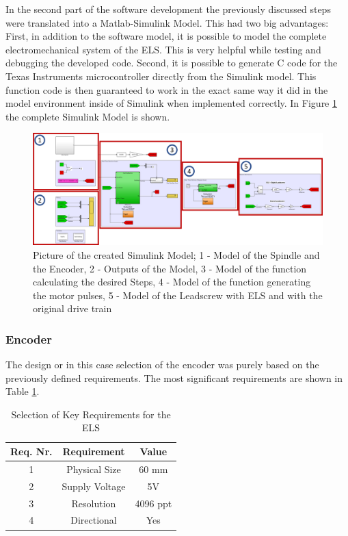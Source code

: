 In the second part of the software development the previously discussed steps were translated into a Matlab-Simulink Model. This had two big advantages: First, in addition to the software model, it is possible to model the complete electromechanical system of the ELS. This is very helpful while testing and debugging the developed code. Second, it is possible to generate C code for the Texas Instruments microcontroller directly from the Simulink model. This function code is then guaranteed to work in the exact same way it did in the model environment inside of Simulink when implemented correctly. In Figure \ref{Simulink Model} the complete Simulink Model is shown.
 
\begin{figure}
    \begin{center}
    \includegraphics[width=12cm]{Pictures/SimulinkModell.png}
    \caption[Picture of the created Simulink Model]{Picture of the created Simulink Model; 1 - Model of the Spindle and the Encoder, 2 - Outputs of the Model, 3 - Model of the function calculating the desired Steps, 4 - Model of the function generating the motor pulses, 5 - Model of the Leadscrew with ELS and with the original drive train}
    \label{Simulink Model}
    \end{center}
\end{figure}
 
 
\subsubsection{Encoder}
The design or in this case selection of the encoder was purely based on the previously defined requirements. The most significant requirements are shown in Table \ref{Tab Encoder Key Requirements}.
 
\begin{table}
    \centering
     \begin{tabular}{||c|c|c||}
        \hline
        Req. Nr. & Requirement & Value\\ [0.5ex]
        \hline\hline
        1 & Physical Size       & 60 mm      \\
        2 & Supply Voltage      & 5V        \\
        3 & Resolution          & 4096 ppt  \\
        4 & Directional         & Yes       \\[1ex]
        \hline
     \end{tabular}
     \caption{Selection of Key Requirements for the ELS}
     \label{Tab Encoder Key Requirements}
\end{table}
 
